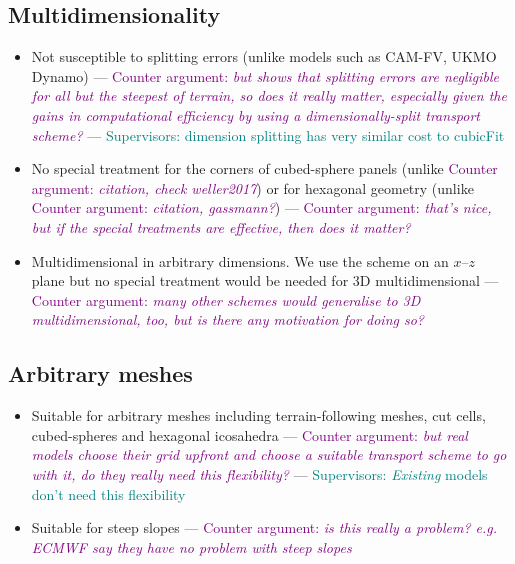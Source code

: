\documentclass{article}
\newcommand{\TODO}[1]{\textcolor{purple}{Counter argument: \emph{#1}}}
\newcommand{\svisor}[1]{\textcolor{teal}{Supervisors: #1}}
\begin{document}
\subsection*{Multidimensionality}
\begin{itemize}
	\item Not susceptible to splitting errors (unlike models such as CAM-FV, UKMO Dynamo) --- \TODO{but \citep{weller2017} shows that splitting errors are negligible for all but the steepest of terrain, so does it really matter, especially given the gains in computational efficiency by using a dimensionally-split transport scheme?} --- \svisor{dimension splitting has very similar cost to cubicFit}
	\item No special treatment for the corners of cubed-sphere panels (unlike \TODO{citation, check weller2017}) or for hexagonal geometry (unlike \TODO{citation, gassmann?}) --- \TODO{that's nice, but if the special treatments are effective, then does it matter?}
	\item Multidimensional in arbitrary dimensions.  We use the scheme on an $x$--$z$ plane but no special treatment would be needed for 3D multidimensional --- \TODO{many other schemes would generalise to 3D multidimensional, too, but is there any motivation for doing so?}
\end{itemize}

\subsection*{Arbitrary meshes}
\begin{itemize}
	\item Suitable for arbitrary meshes including terrain-following meshes, cut cells, cubed-spheres and hexagonal icosahedra --- \TODO{but real models choose their grid upfront and choose a suitable transport scheme to go with it, do they really need this flexibility?} --- \svisor{\emph{Existing} models don't need this flexibility}
	\item Suitable for steep slopes --- \TODO{is this really a problem?  e.g. ECMWF say they have no problem with steep slopes}
\end{itemize}
\end{document}

